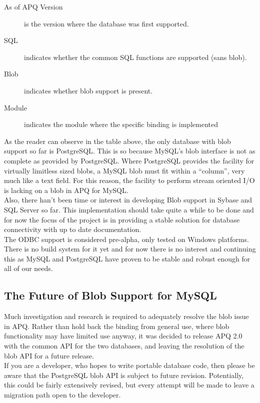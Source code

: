 \documentclass[english,letterpaper]{book}
\begin{document}
\begin{description}
   \item [As of APQ Version]is the version where the database was first supported.
   \item [SQL]indicates whether the common SQL functions are supported (sans blob).
   \item [Blob]indicates whether blob support is present.
   \item [Module]indicates the module where the specific binding is implemented
\end{description}

As the reader can observe in the table above, the only database with blob support
so far is PostgreSQL. This is so because MySQL's blob interface is not as complete as provided by PostgreSQL.
Where PostgreSQL provides the facility for virtually limitless sized
blobs, a MySQL blob must fit within a ``column'', very much like
a text field. For this reason, the facility to perform stream oriented
I/O is lacking on a blob in APQ for MySQL.\\

Also, there han't been time or interest in developing Blob support in Sybase and SQL Server
so far. This implementation should take quite a while to be done and for now the focus of 
the project is in providing a stable solution for database connectivity with up to date documentation.\\


The ODBC support is considered pre-alpha, only tested on Windows platforms.
There is no build system for it yet and for now there is no interest and continuing this as
MySQL and PostgreSQL have proven to be stable and robust enough for all of our needs.


\subsection{The Future of Blob Support for MySQL}

Much investigation and research is required to adequately resolve
the blob issue in APQ. Rather than hold back the binding from general
use, where blob functionality may have limited use anyway, it was
decided to release APQ 2.0 with the common API for the two databases,
and leaving the resolution of the blob API for a future release.\\

If you are a developer, who hopes to write portable database code,
then please be aware that the PostgreSQL blob API is subject to future
revision. Potentially, this could be fairly extensively revised, but
every attempt will be made to leave a migration path open to the developer.
\end{document}
